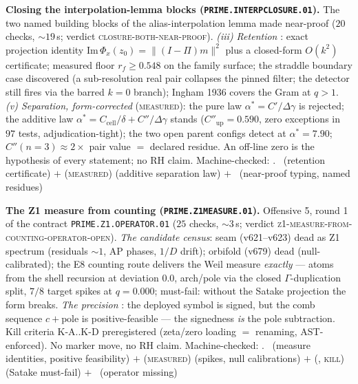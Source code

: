 \par\smallskip\noindent\textbf{Closing the interpolation-lemma
blocks (\texttt{PRIME.INTERPCLOSURE.01}).}
The two named building blocks of the alias-interpolation lemma made
near-proof ($20$ checks, ${\sim}19$\,s; verdict
\textsc{closure-both-near-proof}).  \emph{(iii) Retention} \mE:
exact projection identity $\mathrm{Im}\,\Phi_x(z_0)=\|(I-\Pi)m\|^2$
plus a closed-form $O(k^2)$ certificate; measured floor
$r_f\ge0.548$ on the family surface; the straddle boundary case
discovered (a sub-resolution real pair collapses the pinned filter;
the detector still fires via the barred $k=0$ branch); Ingham 1936
covers the Gram at $q>1$.  \emph{(v) Separation, form-corrected}
(\textsc{measured}): the pure law $\alpha^*=C'/\Delta\gamma$ is
rejected; the additive law
$\alpha^*=C_{\mathrm{cell}}/\delta+C''/\Delta\gamma$ stands
($C''_{\mathrm{up}}=0.590$, zero exceptions in $97$ tests,
adjudication-tight); the two open parent configs detect at
$\alpha^*=7.90$; $C''(n{=}3)\approx2\times$ pair value $=$ declared
residue.  An off-line zero is the hypothesis of every statement; no
RH claim.
Machine-checked: .
\mE\ (retention certificate) $+$ (\textsc{measured}) (additive
separation law) $+$ \mC\ (near-proof typing, named residues)
\par\smallskip


\par\smallskip\noindent\textbf{The Z1 measure from counting
(\texttt{PRIME.Z1MEASURE.01}).}
Offensive 5, round 1 of the contract \texttt{PRIME.Z1.OPERATOR.01}
($25$ checks, ${\sim}3$\,s; verdict
\textsc{z1-measure-from-counting-operator-open}).  \emph{The
candidate census}: seam (v621--v623) dead as Z1 spectrum (residuals
${\sim}1$, AP phases, $1/D$ drift); orbifold (v679) dead
(null-calibrated); the E8 counting route delivers the Weil measure
\emph{exactly} --- atoms from the shell recursion at deviation
$0.0$, arch/pole via the closed $\Gamma$-duplication split, $7/8$
target spikes at $q=0.000$; must-fail: without the Satake projection
the form breaks.  \emph{The precision} \mE: the deployed symbol is
signed, but the comb sequence $c+\mathrm{pole}$ is
positive-feasible --- the signedness \emph{is} the pole subtraction.
Kill criteria K-A..K-D preregistered (zeta/zero loading $=$
renaming, AST-enforced).  No marker move, no RH claim.
Machine-checked: .
\mE\ (measure identities, positive feasibility) $+$
(\textsc{measured}) (spikes, null calibrations) $+$ (\mE,
\textsc{kill}) (Satake must-fail) $+$ \mO\ (operator missing)
\par\smallskip


